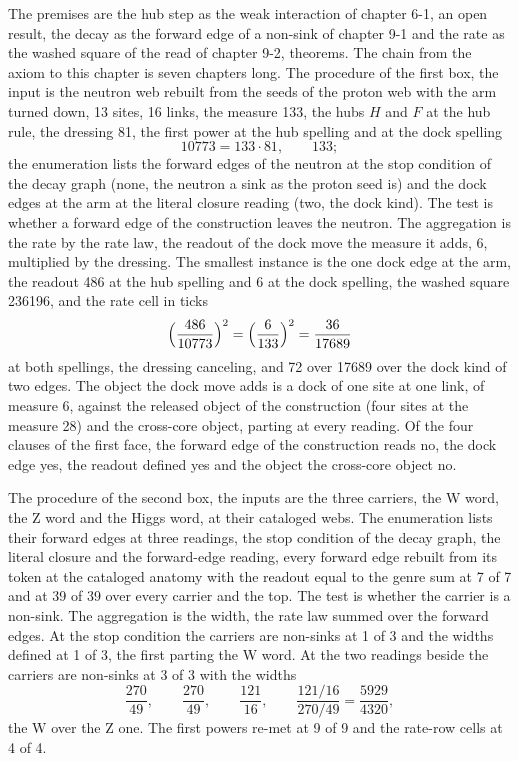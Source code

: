 \begin{chproof}
The premises are the hub step as the weak interaction of chapter 6-1, an open result, the decay as the forward edge of a non-sink of chapter 9-1 and the rate as the washed square of the read of chapter 9-2, theorems. The chain from the axiom to this chapter is seven chapters long. The procedure of the first box, the input is the neutron web rebuilt from the seeds of the proton web with the arm turned down, 13 sites, 16 links, the measure 133, the hubs $H$ and $F$ at the hub rule, the dressing 81, the first power at the hub spelling and at the dock spelling
\begin{equation}
10773 = 133 \cdot 81, \qquad 133 ;
\end{equation}
the enumeration lists the forward edges of the neutron at the stop condition of the decay graph (none, the neutron a sink as the proton seed is) and the dock edges at the arm at the literal closure reading (two, the dock kind). The test is whether a forward edge of the construction leaves the neutron. The aggregation is the rate by the rate law, the readout of the dock move the measure it adds, 6, multiplied by the dressing. The smallest instance is the one dock edge at the arm, the readout 486 at the hub spelling and 6 at the dock spelling, the washed square 236196, and the rate cell in ticks
\begin{equation}
\Bigl(\frac{486}{10773}\Bigr)^{2} = \Bigl(\frac{6}{133}\Bigr)^{2} = \frac{36}{17689}
\end{equation}
at both spellings, the dressing canceling, and 72 over 17689 over the dock kind of two edges. The object the dock move adds is a dock of one site at one link, of measure 6, against the released object of the construction (four sites at the measure 28) and the cross-core object, parting at every reading. Of the four clauses of the first face, the forward edge of the construction reads no, the dock edge yes, the readout defined yes and the object the cross-core object no.

The procedure of the second box, the inputs are the three carriers, the W word, the Z word and the Higgs word, at their cataloged webs. The enumeration lists their forward edges at three readings, the stop condition of the decay graph, the literal closure and the forward-edge reading, every forward edge rebuilt from its token at the cataloged anatomy with the readout equal to the genre sum at 7 of 7 and at 39 of 39 over every carrier and the top. The test is whether the carrier is a non-sink. The aggregation is the width, the rate law summed over the forward edges. At the stop condition the carriers are non-sinks at 1 of 3 and the widths defined at 1 of 3, the first parting the W word. At the two readings beside the carriers are non-sinks at 3 of 3 with the widths
\begin{equation}
\frac{270}{49}, \qquad \frac{270}{49}, \qquad \frac{121}{16}, \qquad \frac{121/16}{270/49} = \frac{5929}{4320},
\end{equation}
the W over the Z one. The first powers re-met at 9 of 9 and the rate-row cells at 4 of 4.


\end{chproof}
